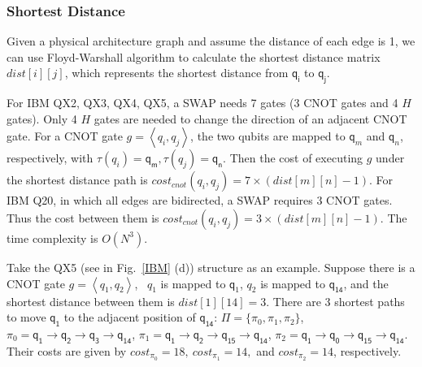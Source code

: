 \documentclass[runningheads]{llncs}
\begin{document}
\subsubsection{Shortest Distance}
Given a physical architecture graph and assume the distance of each edge is 1, we can use Floyd-Warshall algorithm to calculate the shortest distance matrix $dist[i][j]$, which represents the shortest distance from $\textsf{q}_{\textsf{i}}$ to $\textsf{q}_{\textsf{j}}$. 

For IBM QX2, QX3, QX4, QX5, a SWAP needs 7 gates (3 CNOT gates and 4 $H$ gates). Only 4 $H$ gates are needed to change the direction of an adjacent CNOT gate. 
For a CNOT gate $g=\left \langle  \textit{q}_\textit{i},\textit{q}_\textit{j} \right \rangle $,
the two qubits are mapped to $\textsf{q}_{m}$ and $\textsf{q}_{n}$, respectively, with $\tau(\textit{q}_\textit{i})=\textsf{q}_{\textsf{m}},\tau(\textit{q}_\textit{j})=\textsf{q}_{\textsf{n}}$. Then the cost of executing $g$ under the shortest distance path is $cost_{cnot}(\textit{q}_\textit{i},\textit{q}_\textit{j})=7 \times( dist[m][n]-1)$. For IBM Q20, in which all edges are bidirected, a SWAP requires 3 CNOT gates. Thus the cost between them is $cost_{cnot}(\textit{q}_\textit{i},\textit{q}_\textit{j})=3 \times( dist[m][n]-1)$. The time complexity is $O (N^{3})$.
\begin{example}
	Take the QX5 (see in Fig.~\ref{IBM} (d))    structure  as an example. Suppose there is a CNOT gate $g=\left \langle  \textit{q}_\textit{1}, \textit{q}_\textit{2} \right \rangle $, \ $\textit{q}_\textit{1}$ is mapped to $\textsf{q}_{1}$,  $\textit{q}_\textit{2}$ is mapped to $\textsf{q}_{\textsf{14}}$, and the shortest distance between them  is $dist[1][14]=3$. There are 3 shortest paths to move $\textsf{q}_{\textsf{1}}$ to the adjacent position of 
$\textsf{q}_{\textsf{14}}$:
$\Pi=\{\pi_{0},\pi_{1},\pi_{2}\}$, 
$\pi_{0}={\textsf{q}_{\textsf{1}}\rightarrow \textsf{q}_{\textsf{2}} \rightarrow \textsf{q}_{\textsf{3}} \rightarrow \textsf{q}_{\textsf{14}}}$,
$\pi_{1}={\textsf{q}_{\textsf{1}}\rightarrow \textsf{q}_{\textsf{2}} \rightarrow \textsf{q}_{\textsf{15}} \rightarrow \textsf{q}_{\textsf{14}}}$,
$\pi_{2}={\textsf{q}_{\textsf{1}}\rightarrow \textsf{q}_{\textsf{0}} \rightarrow \textsf{q}_{\textsf{15}} \rightarrow \textsf{q}_{\textsf{14}}}$.
Their costs are given by 
$cost_{\pi_{0}}=18,\ cost_{\pi_{1}}=14,$ and $ cost_{\pi_{2}}=14$, respectively.
\end{example}
\end{document}
